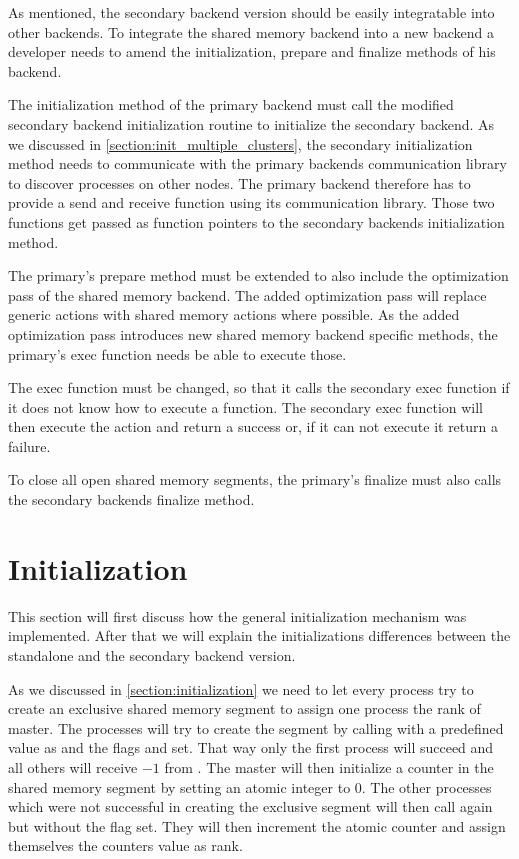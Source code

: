 As mentioned, the secondary backend version should be easily integratable into other backends.
To integrate the shared memory backend into a new backend a developer needs to amend the initialization, prepare and finalize methods of his backend.

The initialization method of the primary backend must call the modified secondary backend initialization routine to initialize the secondary backend.
As we discussed in \autoref{section:init_multiple_clusters}, the secondary initialization method needs to communicate with the primary backends communication library to discover processes on other nodes.
The primary backend therefore has to provide a send and receive function using its communication library.
Those two functions get passed as function pointers to the secondary backends initialization method. 

The primary's prepare method must be extended to also include the optimization pass of the shared memory backend.
The added optimization pass will replace generic actions with shared memory actions where possible.
As the added optimization pass introduces new shared memory backend specific methods, the primary's exec function needs be able to execute those.

The exec function must be changed, so that it calls the secondary exec function if it does not know how to execute a function.
The secondary exec function will then execute the action and return a success or, if it can not execute it return a failure.

To close all open shared memory segments, the primary's finalize must also calls the secondary backends finalize method.


\section{Initialization}

This section will first discuss how the general initialization mechanism was implemented.
After that we will explain the initializations differences between the standalone and the secondary backend version.

As we discussed in \autoref{section:initialization} we need to let every process try to create an exclusive shared memory segment to assign one process the rank of master.
The processes will try to create the segment by calling  with a predefined value as  and the flags  and  set.
That way only the first process will succeed and all others will receive $-1$ from .
The master will then initialize a counter in the shared memory segment by setting an atomic integer to $0$.
The other processes which were not successful in creating the exclusive segment will then call  again but without the  flag set.
They will then increment the atomic counter and assign themselves the counters value as rank.

